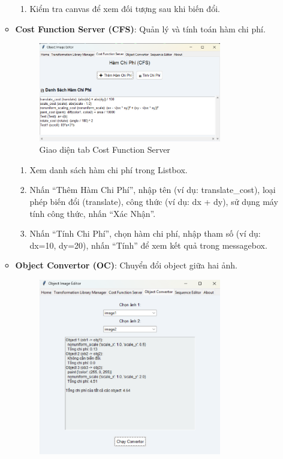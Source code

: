 \documentclass[a4paper,12pt]{article}
\begin{document}
\begin{enumerate}
\begin{itemize}
\begin{enumerate}
            \item Kiểm tra canvas để xem đối tượng sau khi biến đổi.
        \end{enumerate}
        \item \textbf{Cost Function Server (CFS)}: Quản lý và tính toán hàm chi phí.
        \begin{figure}[H]
    \centering
    \includegraphics[width=0.8\textwidth]{CFS.png}
    \caption{Giao diện tab Cost Function Server}
    \label{fig:tlm_tab}
\end{figure}
        \begin{enumerate}
            \item Xem danh sách hàm chi phí trong Listbox.
            \item Nhấn ``Thêm Hàm Chi Phí'', nhập tên (ví dụ: translate\_cost), loại phép biến đổi (translate), công thức (ví dụ: dx + dy), sử dụng máy tính công thức, nhấn ``Xác Nhận''.
            \item Nhấn ``Tính Chi Phí'', chọn hàm chi phí, nhập tham số (ví dụ: dx=10, dy=20), nhấn ``Tính'' để xem kết quả trong messagebox.
        \end{enumerate}
        \item \textbf{Object Convertor (OC)}: Chuyển đổi object giữa hai ảnh.
        \begin{figure}[H]
    \centering
    \includegraphics[width=0.8\textwidth]{OC.png}

\end{figure}
\end{itemize}
\end{enumerate}
\end{document}
